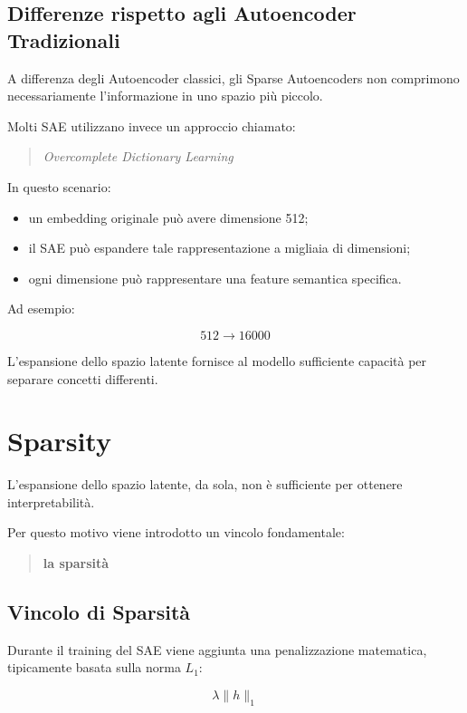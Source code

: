 \subsection{Differenze rispetto agli Autoencoder Tradizionali}

A differenza degli Autoencoder classici, gli Sparse Autoencoders non comprimono necessariamente l'informazione in uno spazio più piccolo.

Molti SAE utilizzano invece un approccio chiamato:

\begin{quote}
\textit{Overcomplete Dictionary Learning}
\end{quote}

In questo scenario:

\begin{itemize}
    \item un embedding originale può avere dimensione 512;
    \item il SAE può espandere tale rappresentazione a migliaia di dimensioni;
    \item ogni dimensione può rappresentare una feature semantica specifica.
\end{itemize}

Ad esempio:

\[
512 \rightarrow 16000
\]

L'espansione dello spazio latente fornisce al modello sufficiente capacità per separare concetti differenti.

\section{Sparsity}

L'espansione dello spazio latente, da sola, non è sufficiente per ottenere interpretabilità.

Per questo motivo viene introdotto un vincolo fondamentale:

\begin{quote}
\textbf{la sparsità}
\end{quote}

\subsection{Vincolo di Sparsità}

Durante il training del SAE viene aggiunta una penalizzazione matematica, tipicamente basata sulla norma $L_1$:

\[
\lambda \|h\|_1
\]

